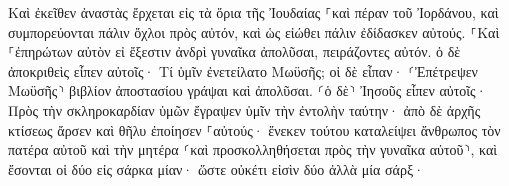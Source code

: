 \documentclass{openreader}
\begin{document}
Καὶ ἐκεῖθεν ἀναστὰς ἔρχεται εἰς τὰ ὅρια τῆς Ἰουδαίας ⸀καὶ πέραν τοῦ Ἰορδάνου, καὶ συμπορεύονται πάλιν ὄχλοι πρὸς αὐτόν, καὶ ὡς εἰώθει πάλιν ἐδίδασκεν αὐτούς. 
⸀Καὶ ⸀ἐπηρώτων αὐτὸν εἰ ἔξεστιν ἀνδρὶ γυναῖκα ἀπολῦσαι, πειράζοντες αὐτόν. 
ὁ δὲ ἀποκριθεὶς εἶπεν αὐτοῖς· Τί ὑμῖν ἐνετείλατο Μωϋσῆς; 
οἱ δὲ εἶπαν· ⸂Ἐπέτρεψεν Μωϋσῆς⸃ βιβλίον ἀποστασίου γράψαι καὶ ἀπολῦσαι. 
⸂ὁ δὲ⸃ Ἰησοῦς εἶπεν αὐτοῖς· Πρὸς τὴν σκληροκαρδίαν ὑμῶν ἔγραψεν ὑμῖν τὴν ἐντολὴν ταύτην· 
ἀπὸ δὲ ἀρχῆς κτίσεως ἄρσεν καὶ θῆλυ ἐποίησεν ⸀αὐτούς· 
ἕνεκεν τούτου καταλείψει ἄνθρωπος τὸν πατέρα αὐτοῦ καὶ τὴν μητέρα ⸂καὶ προσκολληθήσεται πρὸς τὴν γυναῖκα αὐτοῦ⸃, 
καὶ ἔσονται οἱ δύο εἰς σάρκα μίαν· ὥστε οὐκέτι εἰσὶν δύο ἀλλὰ μία σάρξ· 
\end{document}
